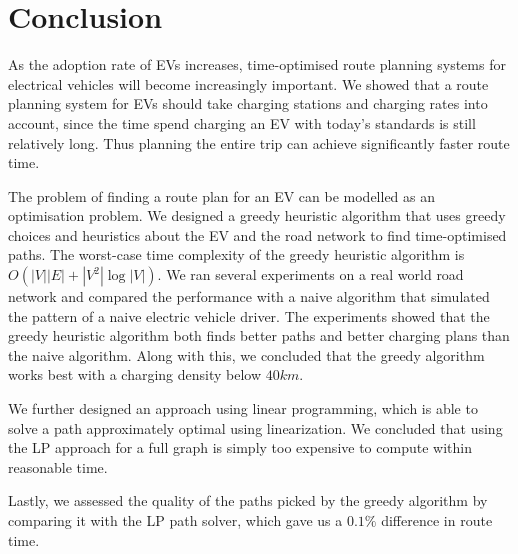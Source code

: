 \section{Conclusion}
\label{sec:conclusion}
As the adoption rate of EVs increases, time-optimised route planning systems for electrical vehicles will become increasingly important. 
We showed that a route planning system for EVs should take charging stations and charging rates into account, since the time spend 
charging an EV with today's standards is still relatively long. Thus planning the entire trip can achieve significantly faster route time. 

The problem of finding a route plan for an EV can be modelled as an optimisation problem. We designed a greedy heuristic algorithm that uses greedy choices and heuristics about the EV and the road network to find time-optimised paths. The worst-case time complexity of the greedy heuristic algorithm is $O(|V||E|+|V^2|\log|V|)$. We ran several experiments on a real world road network and compared the performance with a naive algorithm that simulated the pattern of a naive electric vehicle driver. The experiments showed that the greedy heuristic algorithm both finds better paths and better charging plans than the naive algorithm. Along with this, we concluded that the greedy algorithm works best with a charging density below $40\si{km}$. 

We further designed an approach using linear programming, which is able to solve a path approximately optimal using linearization. We concluded that using the LP approach for a full graph is simply too expensive to compute within reasonable time.

Lastly, we assessed the quality of the paths picked by the greedy algorithm by comparing it with the LP path solver, which gave us a $0.1\%$ difference in route time.
